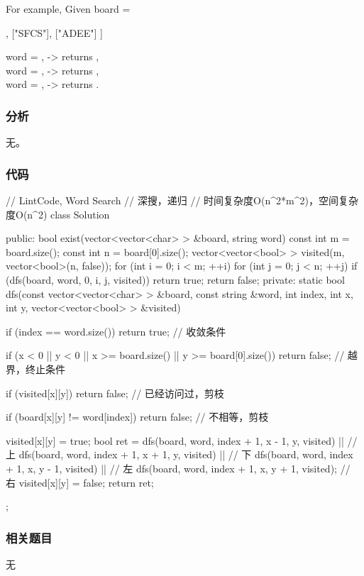 For example,
Given board =
\begin{Code}
[
  ["ABCE"],
  ["SFCS"],
  ["ADEE"]
]
\end{Code}
word = , -> returns ,\\
word = , -> returns ,\\
word = , -> returns .


\subsubsection{分析}
无。


\subsubsection{代码}
\begin{Code}
// LintCode, Word Search
// 深搜，递归
// 时间复杂度O(n^2*m^2)，空间复杂度O(n^2)
class Solution {
public:
    bool exist(vector<vector<char> > &board, string word) {
        const int m = board.size();
        const int n = board[0].size();
        vector<vector<bool> > visited(m, vector<bool>(n, false));
        for (int i = 0; i < m; ++i)
            for (int j = 0; j < n; ++j)
                if (dfs(board, word, 0, i, j, visited))
                    return true;
        return false;
    }
private:
    static bool dfs(const vector<vector<char> > &board, const string &word,
            int index, int x, int y, vector<vector<bool> > &visited) {
        if (index == word.size())
            return true; // 收敛条件

        if (x < 0 || y < 0 || x >= board.size() || y >= board[0].size())
            return false;  // 越界，终止条件

        if (visited[x][y]) return false; // 已经访问过，剪枝

        if (board[x][y] != word[index]) return false; // 不相等，剪枝

        visited[x][y] = true;
        bool ret = dfs(board, word, index + 1, x - 1, y, visited) || // 上
                dfs(board, word, index + 1, x + 1, y, visited)    || // 下
                dfs(board, word, index + 1, x, y - 1, visited)    || // 左
                dfs(board, word, index + 1, x, y + 1, visited);      // 右
        visited[x][y] = false;
        return ret;
    }
};
\end{Code}


\subsubsection{相关题目}
\begindot
\item 无
\myenddot


